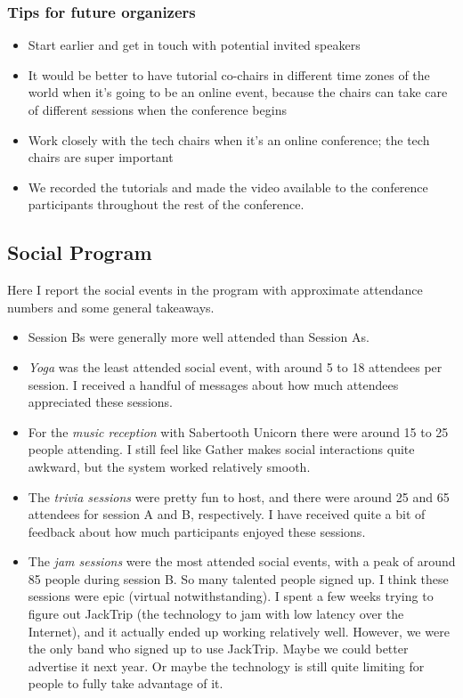 \documentclass[%
10pt,								%
titlepage,						%
]
{scrartcl}
\begin{document}
        \subsubsection{Tips for future organizers}
            \begin{itemize}
                \item Start earlier and get in touch with potential invited speakers

                \item   It would be better to have tutorial co-chairs in different time zones of the world when it's going to be an online event, because the chairs can take care of different sessions when the conference begins

                \item  Work closely with the tech chairs when it's an online conference; the tech chairs are super important

                \item  We recorded the tutorials and made the video available to the conference participants throughout the rest of the conference.
            \end{itemize}
    
    \subsection{Social Program}
        Here I report the social events in the program with approximate attendance numbers and some general takeaways.

        \begin{itemize}
            \item Session Bs were generally more well attended than Session As.
            \item   \textit{Yoga} was the least attended social event, with around 5 to 18 attendees per session. I received a handful of messages about how much attendees appreciated these sessions.
            \item   For the \textit{music reception} with Sabertooth Unicorn there were around 15 to 25 people attending. I still feel like Gather makes social interactions quite awkward, but the system worked relatively smooth.
            \item   The \textit{trivia sessions} were pretty fun to host, and there were around 25 and 65 attendees for session A and B, respectively. I have received quite a bit of feedback about how much participants enjoyed these sessions.
            \item   The \textit{jam sessions} were the most attended social events, with a peak of around 85 people during session B. So many talented people signed up. I think these sessions were epic (virtual notwithstanding). I spent a few weeks trying to figure out JackTrip (the technology to jam with low latency over the Internet), and it actually ended up working relatively well. However, we were the only band who signed up to use JackTrip. Maybe we could better advertise it next year. Or maybe the technology is still quite limiting for people to fully take advantage of it.
        \end{itemize}
 
\end{document}
